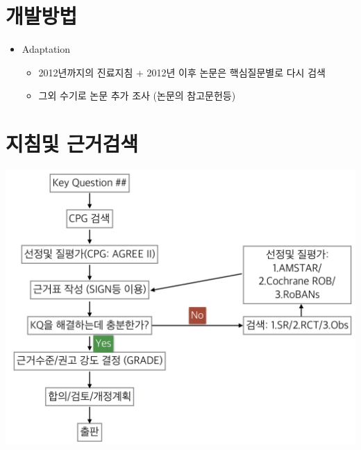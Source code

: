 \documentclass[]{book}
\begin{document}
\hypertarget{section-42}{%
\section*{개발방법}\label{section-42}}

\begin{itemize}
\item
  Adaptation

  \begin{itemize}
  \item
    2012년까지의 진료지침 + 2012년 이후 논문은 핵심질문별로 다시 검색
  \item
    그외 수기로 논문 추가 조사 (논문의 참고문헌등)
  \end{itemize}
\end{itemize}

\hypertarget{section-43}{%
\section*{지침및 근거검색}\label{section-43}}

\includegraphics{static/SearchProcess.png}
\end{document}
